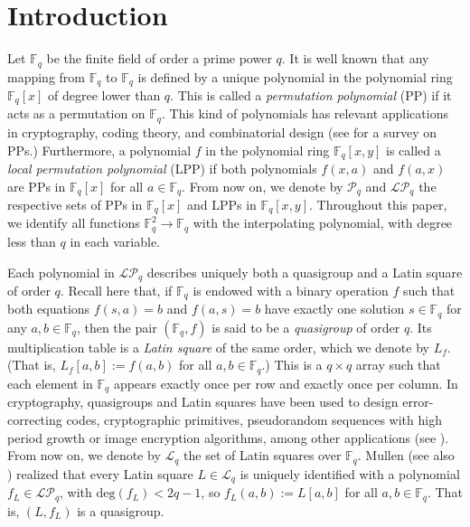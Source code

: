 \documentclass[pdflatex,sn-mathphys-num]{sn-jnl}
\theoremstyle{thmstyleone}%
\begin{document}

\maketitle

\section{Introduction}\label{sec:introduction}

Let $\mathbb{F}_q$ be the finite field of order a prime power $q$. It is well known \cite{Lidl1997} that any mapping from $\mathbb{F}_q$ to $\mathbb{F}_q$ is defined by a unique polynomial in the polynomial ring $\mathbb{F}_q[x]$ of degree lower than $q$. This is called a {\em permutation polynomial} (PP) if it acts as a permutation on $\mathbb{F}_q$. This kind of polynomials has relevant applications in cryptography, coding theory, and combinatorial design (see \cite{Hou2015} for a survey on PPs.) Furthermore, a polynomial $f$ in the polynomial ring $\mathbb{F}_q[x,y]$ is called a {\em local permutation polynomial} (LPP) if both polynomials $f(x,a)$ and $f(a,x)$ are PPs in $\mathbb{F}_q[x]$ for all $a\in\mathbb{F}_q$. From now on, we denote by $\mathcal{P}_q$ and $\mathcal{LP}_q$ the respective sets of PPs in $\mathbb{F}_q[x]$ and LPPs in $\mathbb{F}_q[x,y]$. Throughout this paper, we identify all functions $\mathbb{F}_q^2 \to \mathbb{F}_q$ with the interpolating polynomial, with degree less than $q$ in each variable.

Each polynomial in $\mathcal{LP}_q$ describes uniquely both a quasigroup and a Latin square of order $q$. Recall here that, if $\mathbb{F}_q$ is endowed with a binary operation $f$ such that both equations $f(s,a)=b$ and $f(a,s)=b$ have exactly one solution $s\in \mathbb{F}_q$ for any $a,b\in \mathbb{F}_q$, then the pair $(\mathbb{F}_q,f)$ is said to be a {\em quasigroup} of order $q$. Its multiplication table is a {\em Latin square} of the same order, which we denote by $L_f$. (That is, $L_f[a,b]:=f(a,b)$ for all $a,b\in\mathbb{F}_q$.) This is a $q\times q$ array such that each element in $\mathbb{F}_q$ appears exactly once per row and exactly once per column. In cryptography, quasigroups and Latin squares have been used to design error-correcting codes, cryptographic primitives, pseudorandom sequences with high period growth or image encryption algorithms, among other applications (see \cite{Shcherbacov2017}). From now on, we denote by $\mathcal{L}_q$ the set of Latin squares over $\mathbb{F}_q$. Mullen \cite{Mullen1981} (see also \cite{Mullen1980, Mullen1980a}) realized that every Latin square $L\in\mathcal{L}_q$ is uniquely identified with a polynomial $f_L\in\mathcal{LP}_q$, with $\mathrm{deg}(f_L)<2q-1$, so $f_L(a,b):=L[a,b]$ for all $a,b\in\mathbb{F}_q$. That is, $(L,f_L)$ is a quasigroup.
\end{document}
